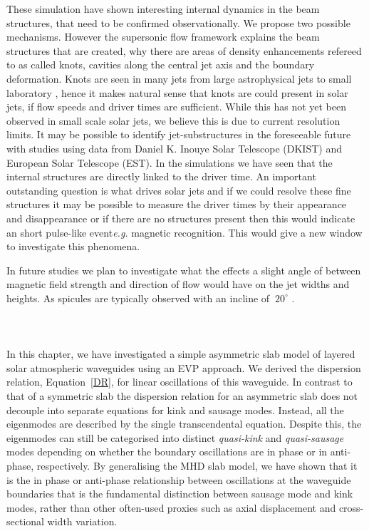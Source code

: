 \documentclass[12pt]{ociamthesis}
\newcommand{\np}{\\ \\}
\begin{document}
These simulation have shown interesting internal dynamics in the beam structures, that need to be confirmed observationally. We propose two possible mechanisms. However the supersonic flow framework explains the beam structures that are created, why there are areas of density enhancements refereed to as called knots, cavities along the central jet axis and the boundary deformation. Knots are seen in many jets from large astrophysical jets \citep{van_Putten_1996ApJ467L57V, DeGouveiaDalPino2005, Hada2013ApJ77570H, Cohen2014ApJ787151C, Hervet2017AnA606A103H} to small laboratory \citep{Menon2010, Edgington-Mitchell2014, Ono2014}, hence it makes natural sense that knots are could present in solar jets, if flow speeds and driver times are sufficient. While this has not yet been observed in small scale solar jets, we believe this is due to current resolution limits. It may be possible to identify jet-substructures in the foreseeable future with studies using data from Daniel K. Inouye Solar Telescope (DKIST) and European Solar Telescope (EST). In the simulations we have seen that the internal structures are directly linked to the driver time. An important outstanding question is what drives solar jets and if we could resolve these fine structures it may be possible to measure the driver times by their appearance and disappearance or if there are no structures present then this would indicate an short pulse-like event\textit{e.g.} magnetic recognition. This would give a new window to investigate this phenomena.

In future studies we plan to investigate what the effects a slight angle of between magnetic field strength and direction of flow would have on the jet widths and heights. As spicules are typically observed with an incline of $~20^{\circ}$ \citep{Tavabi2012JMPh31786T}.   \np \np
In this chapter, we have investigated a simple asymmetric slab model of layered solar atmospheric waveguides using an EVP approach. We derived the dispersion relation, Equation~\eqref{DR}, for linear oscillations of this waveguide. In contrast to that of a symmetric slab the dispersion relation for an asymmetric slab does not decouple into separate equations for kink and sausage modes. Instead, all the eigenmodes are described by the single transcendental equation. Despite this, the eigenmodes can still be categorised into distinct \textit{quasi-kink} and \textit{quasi-sausage} modes depending on whether the boundary oscillations are in phase or in anti-phase, respectively. By generalising the MHD slab model, we have shown that it is the in phase or anti-phase relationship between oscillations at the waveguide boundaries that is the fundamental distinction between sausage mode and kink modes, rather than other often-used proxies such as axial displacement and cross-sectional width variation.
\end{document}
